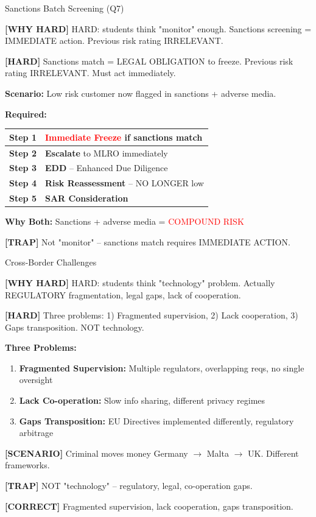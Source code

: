 \documentclass[6pt,aspectratio=169,fontsize=5pt]{beamer}
\renewcommand{\tiny}{\fontsize{3.5pt}{4.5pt}\selectfont}
\renewcommand{\normalsize}{\fontsize{7.5pt}{8.5pt}\selectfont}
\newcommand{\trap}[1]{%
	\begin{block}{\textcolor{redtrap}{\textbf{[TRAP]}}}
		\textcolor{redtrap}{\tiny #1}
	\end{block}
}
\newcommand{\scenario}[1]{%
	\begin{block}{\textbf{[SCENARIO]}}
		\tiny #1
	\end{block}
}
\newcommand{\correct}[1]{%
	\begin{block}{\textcolor{greencorrect}{\textbf{[CORRECT]}}}
		\textcolor{greencorrect}{\tiny #1}
	\end{block}
}
\newcommand{\hard}[1]{%
	\begin{block}{\textcolor{hardcolor}{\textbf{[HARD]}}}
		\textcolor{hardcolor}{\tiny #1}
	\end{block}
}
\newcommand{\hardexplain}[1]{%
	\begin{block}{\textcolor{orangehard}{\textbf{[WHY HARD]}}}
		\textcolor{orangehard}{\tiny #1}
	\end{block}
}
\begin{document}
	\begin{frame}{\normalsize Sanctions Batch Screening (Q7)}
		
		\hardexplain{HARD: students think "monitor" enough. Sanctions screening = IMMEDIATE action. Previous risk rating IRRELEVANT.}
		
		\hard{Sanctions match = LEGAL OBLIGATION to freeze. Previous risk rating IRRELEVANT. Must act immediately.}
		
		\textbf{Scenario:} Low risk customer now flagged in sanctions + adverse media.
		
		\textbf{Required:}
		\begin{table}
			\begin{tabular}{|p{1.8cm}|p{5.5cm}|}
				\hline
				\textbf{Step 1} & \textcolor{red}{\textbf{Immediate Freeze}} if sanctions match \\
				\hline
				\textbf{Step 2} & \textbf{Escalate} to MLRO immediately \\
				\hline
				\textbf{Step 3} & \textbf{EDD} -- Enhanced Due Diligence \\
				\hline
				\textbf{Step 4} & \textbf{Risk Reassessment} -- NO LONGER low \\
				\hline
				\textbf{Step 5} & \textbf{SAR Consideration} \\
				\hline
			\end{tabular}
		\end{table}
		
		\textbf{Why Both:} Sanctions + adverse media = \textcolor{red}{COMPOUND RISK}
		
		\trap{Not "monitor" -- sanctions match requires IMMEDIATE ACTION.}
	\end{frame}
	
	\begin{frame}{\normalsize Cross-Border Challenges}
		
		\hardexplain{HARD: students think "technology" problem. Actually REGULATORY fragmentation, legal gaps, lack of cooperation.}
		
		\hard{Three problems: 1) Fragmented supervision, 2) Lack cooperation, 3) Gaps transposition. NOT technology.}
		
		\textbf{Three Problems:}
		\begin{enumerate}
			\item \textbf{Fragmented Supervision:} Multiple regulators, overlapping reqs, no single oversight
			\item \textbf{Lack Co-operation:} Slow info sharing, different privacy regimes
			\item \textbf{Gaps Transposition:} EU Directives implemented differently, regulatory arbitrage
		\end{enumerate}
		
		\scenario{Criminal moves money Germany $\to$ Malta $\to$ UK. Different frameworks.}
		
		\trap{NOT "technology" -- regulatory, legal, co-operation gaps.}
		
		\correct{Fragmented supervision, lack cooperation, gaps transposition.}
	\end{frame}
	
\end{document}

